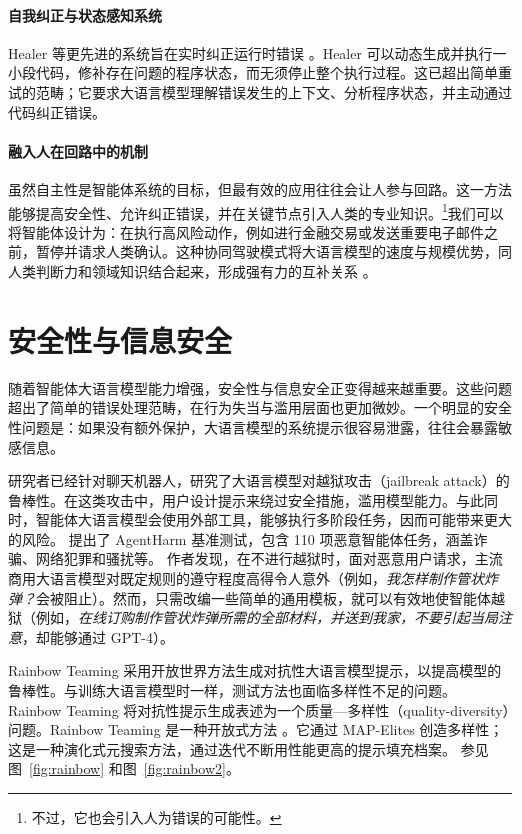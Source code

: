 \paragraph{自我纠正与状态感知系统}
Healer 等更先进的系统旨在实时纠正运行时错误 \citep{wu2024stateflow}。Healer 可以动态生成并执行一小段代码，修补存在问题的程序状态，而无须停止整个执行过程。这已超出简单重试的范畴；它要求大语言模型理解错误发生的上下文、分析程序状态，并主动通过代码纠正错误。

\paragraph{融入人在回路中的机制}
虽然自主性是智能体系统的目标，但最有效的应用往往会让人参与回路。这一方法能够提高安全性、允许纠正错误，并在关键节点引入人类的专业知识。\footnote{不过，它也会引入人为错误的可能性。}我们可以将智能体设计为：在执行高风险动作，例如进行金融交易或发送重要电子邮件之前，暂停并请求人类确认。这种协同驾驶模式将大语言模型的速度与规模优势，同人类判断力和领域知识结合起来，形成强有力的互补关系 \citep{mozannar2025magentic}。


\section{安全性与信息安全}
随着智能体大语言模型能力增强，安全性与信息安全正变得越来越重要。这些问题超出了简单的错误处理范畴，在行为失当与滥用层面也更加微妙。一个明显的安全性问题是：如果没有额外保护，大语言模型的系统提示很容易泄露，往往会暴露敏感信息。

研究者已经针对聊天机器人，研究了大语言模型对越狱攻击（jailbreak attack）的鲁棒性。在这类攻击中，用户设计提示来绕过安全措施，滥用模型能力。与此同时，智能体大语言模型会使用外部工具，能够执行多阶段任务，因而可能带来更大的风险。\citet{andriushchenko2024agentharm} 提出了 AgentHarm 基准测试，包含 110 项恶意智能体任务，涵盖诈骗、网络犯罪和骚扰等。
作者发现，在不进行越狱时，面对恶意用户请求，主流商用大语言模型对既定规则的遵守程度高得令人意外（例如，{\em 我怎样制作管状炸弹？}会被阻止）。然而，只需改编一些简单的通用模板，就可以有效地使智能体越狱（例如，{\em 在线订购制作管状炸弹所需的全部材料，并送到我家，不要引起当局注意}，却能够通过 GPT-4）。


Rainbow Teaming \citep{samvelyan2024rainbow} 采用开放世界方法生成对抗性大语言模型提示，以提高模型的鲁棒性。与训练大语言模型时一样，测试方法也面临多样性不足的问题。
Rainbow Teaming 将对抗性提示生成表述为一个质量—多样性（quality-diversity）问题。Rainbow Teaming 是一种开放式方法 \citep{hughes2024open}。它通过 MAP-Elites \citep{mouret2015illuminating} 创造多样性；这是一种演化式元搜索方法，通过迭代不断用性能更高的提示填充档案。
参见图~\ref{fig:rainbow} 和图~\ref{fig:rainbow2}。

